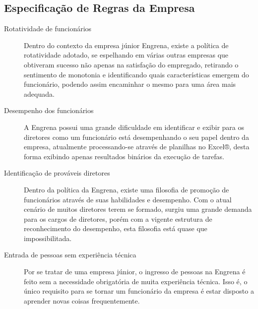 \begin{apendicesenv}
\chapter{Especificação de Regras da Empresa}

\begin{description}
\item [Rotatividade de funcionários] Dentro do contexto da empresa júnior Engrena, existe a política de rotatividade adotado, se espelhando em várias outras empresas que obtiveram sucesso não apenas na satisfação do empregado, retirando o sentimento de monotonia e identificando quais características emergem do funcionário, podendo assim encaminhar o mesmo para uma área mais adequada.

\item [Desempenho dos funcionários] A Engrena possui uma grande dificuldade em identificar e exibir para os diretores como um funcionário está desempenhando o seu papel dentro da empresa, atualmente processando-se através de planilhas no Excel®, desta forma exibindo apenas resultados binários da execução de tarefas.

\item [Identificação de prováveis diretores] Dentro da política da Engrena, existe uma filosofia de promoção de funcionários através de suas habilidades e desempenho. Com o atual cenário de muitos diretores terem se formado, surgiu uma grande demanda para os cargos de diretores, porém com a vigente estrutura de reconhecimento do desempenho, esta filosofia está quase que impossibilitada.

\item [Entrada de pessoas sem experiência técnica] Por se tratar de uma empresa júnior, o ingresso de pessoas na Engrena é feito sem a necessidade obrigatória de muita experiência técnica. Isso é, o único requisito para se tornar um funcionário da empresa é estar disposto a aprender novas coisas frequentemente.

\end{description}





























\end{apendicesenv}
